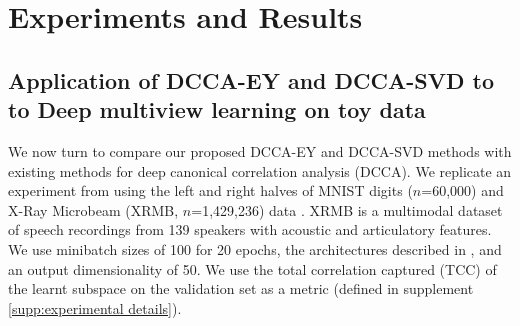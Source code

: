 \section{Experiments and Results}

\subsection{Application of DCCA-EY and DCCA-SVD to to Deep multiview learning on toy data}

We now turn to compare our proposed DCCA-EY and DCCA-SVD methods with existing methods for deep canonical correlation analysis (DCCA). We replicate an experiment from \cite{wang2015stochastic} using the left and right halves of MNIST \cite{lecun1998gradient} digits ($n$=60,000) and X-Ray Microbeam (XRMB, $n$=1,429,236) data \cite{westbury1994x}. XRMB is a multimodal dataset of speech recordings from 139 speakers with acoustic and articulatory features. We use minibatch sizes of 100 for 20 epochs, the architectures described in \cite{wang2015stochastic}, and an output dimensionality of 50.  We use the total correlation captured (TCC) of the learnt subspace on the validation set as a metric (defined in supplement \ref{supp:experimental details}).

